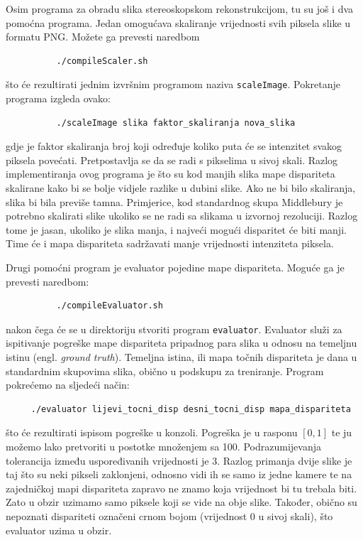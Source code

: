 \documentclass[utf8, zavrsni, numeric]{fer}
\begin{document}
Osim programa za obradu slika stereoskopskom rekonstrukcijom, tu su još i dva pomoćna programa. Jedan omogućava skaliranje vrijednosti svih piksela slike u formatu PNG. Možete ga prevesti
naredbom
\begin{verbatim}
          ./compileScaler.sh
\end{verbatim}
što će rezultirati jednim izvršnim programom naziva {\tt scaleImage}. Pokretanje programa
izgleda ovako:
\begin{verbatim}
          ./scaleImage slika faktor_skaliranja nova_slika
\end{verbatim}
gdje je faktor skaliranja broj koji određuje koliko puta će se intenzitet svakog piksela povećati. Pretpostavlja se da se radi s pikselima u sivoj skali. Razlog implementiranja ovog programa
je što su kod manjih slika mape dispariteta skalirane kako bi se bolje vidjele razlike u dubini slike. Ako ne bi bilo skaliranja, slika bi bila previše tamna. Primjerice, kod standardnog skupa Middlebury je potrebno skalirati slike ukoliko se ne radi sa slikama u izvornoj rezoluciji. Razlog tome je jasan, ukoliko je slika manja, i najveći mogući disparitet će biti manji.
Time će i mapa dispariteta sadržavati manje vrijednosti intenziteta piksela.

Drugi pomoćni program je evaluator pojedine mape dispariteta. Moguće ga je prevesti naredbom:
\begin{verbatim}
          ./compileEvaluator.sh
\end{verbatim}
nakon čega će se u direktoriju stvoriti program {\tt evaluator}. Evaluator služi za ispitivanje
pogreške mape dispariteta pripadnog para slika u odnosu na temeljnu istinu (engl. {\sl ground truth}). Temeljna istina, ili mapa točnih dispariteta je dana u standardnim skupovima slika, 
obično u podskupu za treniranje. Program pokrećemo na sljedeći način:
\begin{verbatim}
     ./evaluator lijevi_tocni_disp desni_tocni_disp mapa_dispariteta
\end{verbatim}
što će rezultirati ispisom pogreške u konzoli. Pogreška je u rasponu $[0, 1]$ te ju možemo lako pretvoriti u postotke množenjem sa 100. Podrazumijevanja tolerancija između uspoređivanih vrijednosti je 3. Razlog primanja dvije slike je taj što su neki
pikseli zaklonjeni, odnosno vidi ih se samo iz jedne kamere te na zajedničkoj mapi dispariteta
zapravo ne znamo koja vrijednost bi tu trebala biti. Zato u obzir uzimamo samo piksele koji se vide na obje slike.
Također, obično su nepoznati dispariteti označeni crnom bojom (vrijednost 0 u sivoj skali), što evaluator uzima u obzir.
\end{document}
